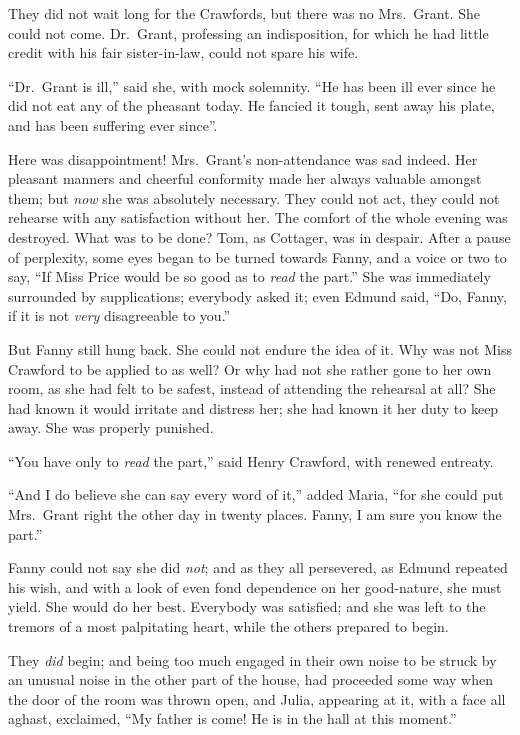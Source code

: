 \documentclass{article}
\begin{document}
They did not wait long for the Crawfords, but there
was no Mrs.\ Grant.  She could not come.  Dr.\ Grant,
professing an indisposition, for which he had little credit
with his fair sister-in-law, could not spare his wife.

``Dr.\ Grant is ill,'' said she, with mock solemnity.
``He has been ill ever since he did not eat any of the
pheasant today.  He fancied it tough, sent away his plate,
and has been suffering ever since''.

Here was disappointment!  Mrs.\ Grant's non-attendance
was sad indeed.  Her pleasant manners and cheerful
conformity made her always valuable amongst them;
but \emph{now} she was absolutely necessary.  They could not act,
they could not rehearse with any satisfaction without her.
The comfort of the whole evening was destroyed.
What was to be done?  Tom, as Cottager, was in despair.
After a pause of perplexity, some eyes began to be
turned towards Fanny, and a voice or two to say,
``If Miss Price would be so good as to \emph{read} the part.''
She was immediately surrounded by supplications;
everybody asked it; even Edmund said, ``Do, Fanny, if it is
not \emph{very} disagreeable to you.''

But Fanny still hung back.  She could not endure the idea
of it.  Why was not Miss Crawford to be applied to as well?
Or why had not she rather gone to her own room,
as she had felt to be safest, instead of attending
the rehearsal at all?  She had known it would irritate
and distress her; she had known it her duty to keep away.
She was properly punished.

``You have only to \emph{read} the part,'' said Henry Crawford,
with renewed entreaty.

``And I do believe she can say every word of it,''
added Maria, ``for she could put Mrs.\ Grant right the other
day in twenty places.  Fanny, I am sure you know the part.''

Fanny could not say she did \emph{not}; and as they all persevered,
as Edmund repeated his wish, and with a look of even
fond dependence on her good-nature, she must yield.
She would do her best.  Everybody was satisfied; and she
was left to the tremors of a most palpitating heart,
while the others prepared to begin.

They \emph{did} begin; and being too much engaged in their
own noise to be struck by an unusual noise in the other
part of the house, had proceeded some way when the door
of the room was thrown open, and Julia, appearing at it,
with a face all aghast, exclaimed, ``My father is come!
He is in the hall at this moment.''
\end{document}
